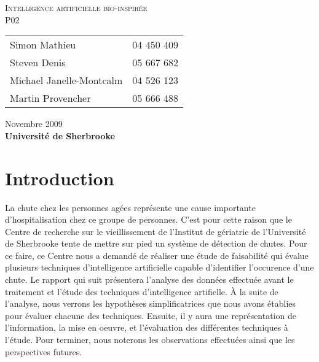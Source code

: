 \documentclass[12pt,letterpaper]{article}
\begin{document}
\renewcommand{\labelitemi}{$\bullet$}
\newcommand{\unit}[1]{\ \mathrm{#1}}
\newcommand{\degree}{\ensuremath{^\circ}}

\thispagestyle{empty}
\begin{center}
	\vspace{20pt}
	\large{\textsc{
		Intelligence artificielle bio-inspirée\\
	}}
	\vspace{20pt}
	\large{\textsc{
		P02
	}}
	\vfill
	\begin{tabular}{ll}
      Simon Mathieu & 04 450 409 \\
      Steven Denis & 05 667 682 \\
	  Michael Janelle-Montcalm & 04 526 123 \\
	  Martin Provencher &	05 666 488 \\
	\end{tabular}
	\vfill
	Novembre 2009 \\
	\textbf{Université de Sherbrooke}
	\vspace{20pt}
\end{center}
\clearpage
\begin{spacing}{0.1}
\tableofcontents
\end{spacing}
\clearpage

\section{Introduction} %
La chute chez les personnes agées représente une cause importante d'hospitalisation chez ce groupe de personnes. C'est pour cette raison que le Centre de recherche sur le vieillissement de l'Institut de gériatrie de l'Université de Sherbrooke tente de mettre sur pied un système de détection de chutes. Pour ce faire, ce Centre nous a demandé de réaliser une étude de faisabilité qui évalue plusieurs techniques d'intelligence artificielle capable d'identifier l'occurence d'une chute. Le rapport qui suit présentera l'analyse des données effectuée avant le traitement et l'étude des techniques d'intelligence artifielle. À la suite de l'analyse, nous verrons les hypothèses simplificatrices que nous avons établies pour évaluer chacune des techniques. Ensuite, il y aura une représentation de l'information, la mise en oeuvre, et l'évaluation des différentes techniques à l'étude. Pour terminer, nous noterons les observations effectuées ainsi que les perspectives futures.
\end{document}
